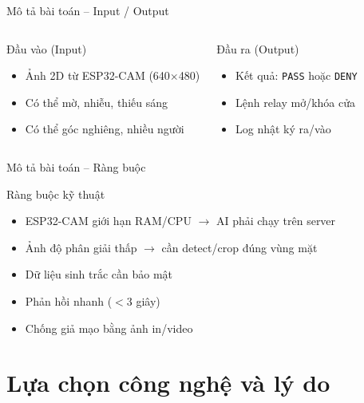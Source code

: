 \documentclass[aspectratio=169]{beamer}
\begin{document}
\begin{frame}{Mô tả bài toán -- Input / Output}
  \begin{columns}[T]
      \begin{block}{Đầu vào (Input)}
        \begin{itemize}
          \item Ảnh 2D từ ESP32-CAM (640$\times$480)
          \item Có thể mờ, nhiễu, thiếu sáng
          \item Có thể góc nghiêng, nhiều người
        \end{itemize}
      \end{block}

      \begin{block}{Đầu ra (Output)}
        \begin{itemize}
          \item Kết quả: \texttt{PASS} hoặc \texttt{DENY}
          \item Lệnh relay mở/khóa cửa
          \item Log nhật ký ra/vào
        \end{itemize}
      \end{block}
  \end{columns}
\end{frame}

\begin{frame}{Mô tả bài toán -- Ràng buộc}
  \begin{alertblock}{Ràng buộc kỹ thuật}
    \begin{itemize}
      \item ESP32-CAM giới hạn RAM/CPU $\to$ AI phải chạy trên server
      \item Ảnh độ phân giải thấp $\to$ cần detect/crop đúng vùng mặt
      \item Dữ liệu sinh trắc cần bảo mật
      \item Phản hồi nhanh ($<$3 giây)
      \item Chống giả mạo bằng ảnh in/video
    \end{itemize}
  \end{alertblock}
\end{frame}

\section{Lựa chọn công nghệ và lý do}
\end{document}

